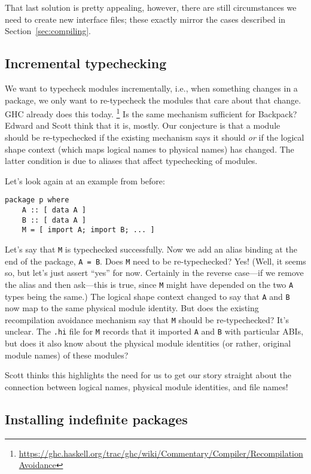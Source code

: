 \documentclass{article}
\begin{document}
That last solution is pretty appealing, however, there are still circumstances
we need to create new interface files; these exactly mirror the cases described
in Section~\ref{sec:compiling}.

\subsection{Incremental typechecking}
We want to typecheck modules incrementally, i.e., when something changes in
a package, we only want to re-typecheck the modules that care about that
change. GHC already does this today.%
\footnote{\url{https://ghc.haskell.org/trac/ghc/wiki/Commentary/Compiler/RecompilationAvoidance}}
Is the same mechanism sufficient for Backpack? Edward and Scott think that it
is, mostly. Our conjecture is that a module should be re-typechecked if the
existing mechanism says it should \emph{or} if the logical shape
context (which maps logical names to physical names) has changed. The latter
condition is due to aliases that affect typechecking of modules.

Let's look again at an example from before:
\begin{verbatim}
package p where
    A :: [ data A ]
    B :: [ data A ]
    M = [ import A; import B; ... ]
\end{verbatim}
Let's say that \verb|M| is typechecked successfully. Now we add an alias binding
at the end of the package, \verb|A = B|. Does \verb|M| need to be
re-typechecked? Yes! (Well, it seems so, but let's just assert ``yes'' for now.
Certainly in the reverse case---if we remove the alias and then ask---this
is true, since \verb|M| might have depended on the two \verb|A| types
being the same.)
The logical shape context changed to say that \verb|A| and
\verb|B| now map to the same physical module identity. But does the existing
recompilation avoidance mechanism say that \verb|M| should be re-typechecked?
It's unclear. The \verb|.hi| file for \verb|M| records that it imported \verb|A| and
\verb|B| with particular ABIs, but does it also know about the physical module
identities (or rather, original module names) of these modules?

Scott thinks this highlights the need for us to get our story straight about
the connection between logical names, physical module identities, and file
names!


\subsection{Installing indefinite packages}\label{sec:installing-indefinite}
\end{document}
